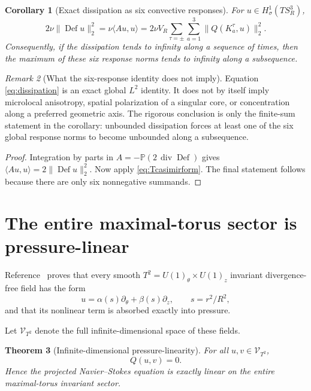 \documentclass[
 aps,
 prd,
 reprint,
 amsmath,
 amssymb,
 nofootinbib,
 superscriptaddress
]{revtex4-2}
\newtheorem{theorem}{Theorem}[section]
\newtheorem{corollary}[theorem]{Corollary}
\theoremstyle{definition}
\theoremstyle{remark}
\newtheorem{remark}[theorem]{Remark}
\newcommand{\Sthree}{S^3_R}
\newcommand{\PP}{\mathbb P}
\newcommand{\cV}{\mathcal V}
\newcommand{\Def}{\operatorname{Def}}
\begin{document}
\begin{corollary}[Exact dissipation as six convective responses]
\label{cor:dissipation}
For $u\in H^1_\sigma(T\Sthree)$,
\begin{equation}
 \boxed{
 2\nu\|\Def u\|_2^2
 =
 \nu\langle Au,u\rangle
 =
 2\nu V_R
 \sum_{\tau=\pm}\sum_{a=1}^3
 \|Q(K_a^\tau,u)\|_2^2.
 }
 \label{eq:dissipation}
\end{equation}
Consequently, if the dissipation tends to infinity along a sequence of
times, then the maximum of these six response norms tends to infinity along
a subsequence.
\end{corollary}


\begin{remark}[What the six-response identity does not imply]
Equation \eqref{eq:dissipation} is an exact global $L^2$ identity.  It does
not by itself imply microlocal anisotropy, spatial polarization of a
singular core, or concentration along a preferred geometric axis.  The
rigorous conclusion is only the finite-sum statement in the corollary:
unbounded dissipation forces at least one of the six global response norms
to become unbounded along a subsequence.
\end{remark}

\begin{proof}
Integration by parts in
$A=-\PP(2\,\operatorname{div}\Def)$ gives
$\langle Au,u\rangle=2\|\Def u\|_2^2$.
Now apply \eqref{eq:Tcasimirform}.  The final statement follows because
there are only six nonnegative summands.
\end{proof}



\section{The entire maximal-torus sector is pressure-linear}

Reference~\cite{PreeceBatenin2026} proves that every smooth
$T^2=U(1)_\theta\times U(1)_z$ invariant divergence-free field has the form
\[
 u=\alpha(s)\partial_\theta+\beta(s)\partial_z,
 \qquad s=r^2/R^2,
\]
and that its nonlinear term is absorbed exactly into pressure.

Let $\cV_{T^2}$ denote the full infinite-dimensional space of these fields.

\begin{theorem}[Infinite-dimensional pressure-linearity]
\label{thm:T2Qzero}
For all $u,v\in\cV_{T^2}$,
\begin{equation}
 \boxed{Q(u,v)=0.}
 \label{eq:T2Qzero}
\end{equation}
Hence the projected Navier--Stokes equation is exactly linear on the entire
maximal-torus invariant sector.
\end{theorem}
\end{document}
